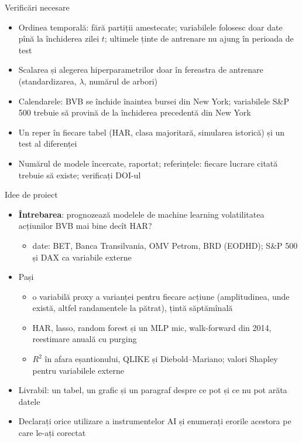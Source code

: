 \begin{frame}{Verificări necesare}
\itemsize{\small}
\begin{itemize}
    \item Ordinea temporală: fără partiții amestecate; variabilele folosesc doar date pînă la închiderea zilei $t$; ultimele ținte de antrenare nu ajung în perioada de test
    \item Scalarea și alegerea hiperparametrilor doar în fereastra de antrenare (standardizarea, $\lambda$, numărul de arbori)
    \item Calendarele: BVB se închide înaintea bursei din New York; variabilele S\&P 500 trebuie să provină de la închiderea precedentă din New York
    \item Un reper în fiecare tabel (HAR, clasa majoritară, simularea istorică) și un test al diferenței
    \item Numărul de modele încercate, raportat; referințele: fiecare lucrare citată trebuie să existe; verificați DOI-ul
\end{itemize}
\end{frame}

\begin{frame}{Idee de proiect}
\itemsize{\small}
\begin{itemize}
    \item \textbf{Întrebarea}: prognozează modelele de machine learning volatilitatea acțiunilor BVB mai bine decît HAR?
    \begin{itemize}
        \item date: BET, Banca Transilvania, OMV Petrom, BRD (EODHD); S\&P 500 și DAX ca variabile externe
    \end{itemize}
    \item Pași
    \begin{itemize}
        \item o variabilă proxy a varianței pentru fiecare acțiune (amplitudinea, unde există, altfel randamentele la pătrat), țintă săptămînală
        \item HAR, lasso, random forest și un MLP mic, walk-forward din 2014, reestimare anuală cu purging
        \item $R^2$ în afara eșantionului, QLIKE și Diebold--Mariano; valori Shapley pentru variabilele externe
    \end{itemize}
    \item Livrabil: un tabel, un grafic și un paragraf despre ce pot și ce nu pot arăta datele
    \item Declarați orice utilizare a instrumentelor AI și enumerați erorile acestora pe care le-ați corectat
\end{itemize}
\end{frame}


